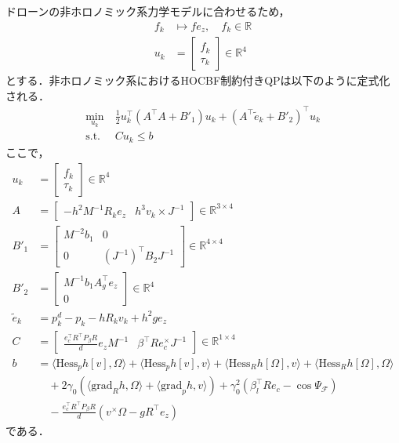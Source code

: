 ドローンの非ホロノミック系力学モデルに合わせるため，
\begin{equation}
\begin{aligned}
f_k &\mapsto f e_z, \quad f_k \in \mathbb{R} \\
u_k &= \begin{bmatrix} f_k \\ \tau_k \end{bmatrix} \in \mathbb{R}^4
\label{eq:nonholonomic_control}
\end{aligned}
\end{equation}
とする．非ホロノミック系におけるHOCBF制約付きQPは以下のように定式化される．
\begin{equation}
\begin{aligned}
\min_{u_k} &\: \frac{1}{2} u_k^\top (A^\top A + B'_1) u_k + (A^\top \tilde{e}_k + B'_2)^\top u_k \\
\mathrm{s.t.} &\: C u_k \leq b
\label{eq:nonholonomic_hocbf_qp}
\end{aligned}
\end{equation}
ここで，
\begin{equation}
\begin{aligned}
u_k &= \begin{bmatrix} f_k \\ \tau_k \end{bmatrix} \in \mathbb{R}^4 \\
A &= \begin{bmatrix} -h^2 M^{-1} R_k e_z & h^3 v_k \times J^{-1} \end{bmatrix} \in \mathbb{R}^{3 \times 4} \\
B'_1 &= \begin{bmatrix} M^{-2} b_1 & 0 \\ 0 & (J^{-1})^\top B_2 J^{-1} \end{bmatrix} \in \mathbb{R}^{4 \times 4} \\
B'_2 &= \begin{bmatrix} M^{-1} b_1 A_g^\top e_z \\ 0 \end{bmatrix} \in \mathbb{R}^{4} \\
\tilde{e}_k &= p^d_{k} - p_k - h R_k v_k + h^2 g e_z \\
C &= \begin{bmatrix} \frac{e_c^\top R^\top P_\beta R}{d} e_z M^{-1} & \beta^\top R e_c^\times J^{-1} \end{bmatrix} \in \mathbb{R}^{1 \times 4} \\
b &= \langle \mathrm{Hess}_p h[v], \Omega \rangle + \langle \mathrm{Hess}_p h[v], v \rangle + \langle \mathrm{Hess}_R h[\Omega], v \rangle + \langle \mathrm{Hess}_R h[\Omega], \Omega \rangle \\
&\quad + 2 \gamma_0 (\langle \mathrm{grad}_R h, \Omega \rangle + \langle \mathrm{grad}_p h, v \rangle) + \gamma_0^2 (\beta_l^{\top} R e_c - \cos \Psi_\mathcal{F}) \\
&\quad - \frac{e_c^\top R^\top P_\beta R}{d} (v^\times \Omega - g R^\top e_z)
\label{eq:nonholonomic_hocbf_qp_parameters}
\end{aligned}
\end{equation}
である．

